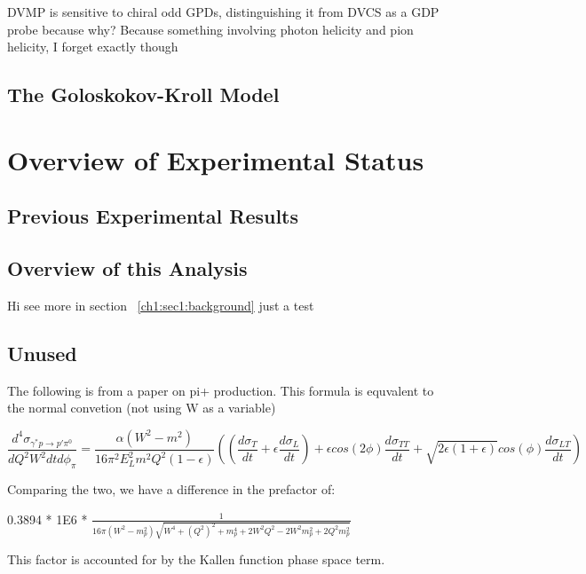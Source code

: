     

 DVMP is sensitive to chiral odd GPDs, distinguishing it from DVCS as a GDP probe because why? Because something involving photon helicity and pion helicity, I forget exactly though
 
    \subsection{The Goloskokov-Kroll Model}
    
\section{Overview of Experimental Status}
    \subsection{Previous Experimental Results}


    \subsection{Overview of this Analysis}
    
Hi \cite{Bedlinskiy2014} see more in section ~\ref{ch1:sec1:background}
just a test



\iffalse
    \subsection{Unused}
        The following is from a paper on pi+ production. This formula is equvalent to the normal convetion (not using W as a variable)
        
         \begin{equation}\label{xsec}
             \frac{d^4\sigma_{\gamma^*p \rightarrow p'\pi^0}}{dQ^2W^2dtd\phi_{\pi}} =
             \frac{\alpha (W^2-m^2)}{16\pi^2 E^2_L m^2 Q^2 (1-\epsilon)}
             ((\frac{d\sigma_T}{dt}+\epsilon\frac{d\sigma_L}{dt})+
             \epsilon cos(2\phi) \frac{d\sigma_{TT}}{dt} + \sqrt{2\epsilon(1+\epsilon)}cos(\phi)\frac{d\sigma_{LT}}{dt})
        \end{equation}
        
        Comparing the two, we have a difference in the prefactor of:
        
        0.3894 * 1E6 * $\frac{1}{16\pi(W^2-m_p^2)\sqrt{W^4 + (Q^2)^2+m_p^4+2W^2Q^2-2W^2m_p^2+2Q^2m_p^2}}$
        
        This factor is accounted for by the Kallen function phase space term.
        
